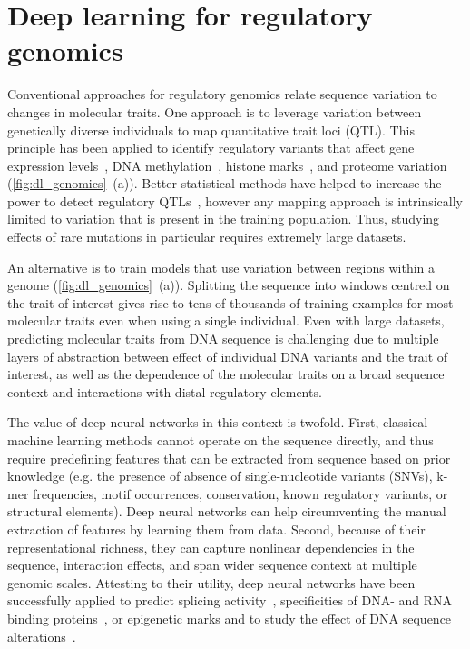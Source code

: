 \section{Deep learning for regulatory genomics}
Conventional approaches for regulatory genomics relate sequence variation to changes in molecular traits. One approach is to leverage variation between genetically diverse individuals to map quantitative trait loci (QTL). This principle has been applied to identify regulatory variants that affect gene expression levels~\citep{montgomery_transcriptome_2010,pickrell_understanding_2010}, DNA methylation~\citep{bell_dna_2011,gibbs_abundant_2010}, histone marks~\citep{grubert_genetic_2015,waszak_population_2015}, and proteome variation~\citep{albert_genetics_2014,battle_genomic_2015,parts_heritability_2014,vincent_stacked_2010} (\autoref{fig:dl_genomics}~(a)). Better statistical methods have helped to increase the power to detect regulatory QTLs~\citep{kang_accurate_2008,parts_joint_2011,rakitsch_modelling_2016,stegle_bayesian_2010}, however any mapping approach is intrinsically limited to variation that is present in the training population. Thus, studying effects of rare mutations in particular requires extremely large datasets.

An alternative is to train models that use variation between regions within a genome (\autoref{fig:dl_genomics}~(a)). Splitting the sequence into windows centred on the trait of interest gives rise to tens of thousands of training examples for most molecular traits even when using a single individual. Even with large datasets, predicting molecular traits from DNA sequence is challenging due to multiple layers of abstraction between effect of individual DNA variants and the trait of interest, as well as the dependence of the molecular traits on a broad sequence context and interactions with distal regulatory elements.

The value of deep neural networks in this context is twofold. First, classical machine learning methods cannot operate on the sequence directly, and thus require predefining features that can be extracted from sequence based on prior knowledge (e.g. the presence of absence of single-nucleotide variants (SNVs), k-mer frequencies, motif occurrences, conservation, known regulatory variants, or structural elements). Deep neural networks can help circumventing the manual extraction of features by learning them from data. Second, because of their representational richness, they can capture nonlinear dependencies in the sequence, interaction effects, and span wider sequence context at multiple genomic scales. Attesting to their utility, deep neural networks have been successfully applied to predict splicing activity~\citep{leung_deep_2014,xiong_human_2015}, specificities of DNA- and RNA binding proteins~\citep{alipanahi_predicting_2015}, or epigenetic marks and to study the effect of DNA sequence alterations~\citep{kelley_basset:_2016,zhou_predicting_2015}.

